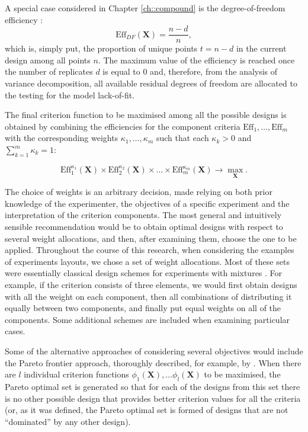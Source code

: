 A special case considered in Chapter \ref{ch::compound} is the degree-of-freedom efficiency \citep{Daniel1976}:
\begin{equation}
\label{eq::DF_eff}
\mbox{Eff}_{DF}(\bm{X})=\frac{n-d}{n},
\end{equation}
which is, simply put, the proportion of unique points $t=n-d$ in the current design among all points $n$. The maximum value of the efficiency is reached once the number of replicates $d$ is equal to $0$ and, therefore, from the analysis of variance decomposition, all available residual degrees of freedom are allocated to the testing for the model lack-of-fit.

The final criterion function to be maximised among all the possible designs is obtained by combining the efficiencies for the component criteria $\mbox{Eff}_{1},\ldots, \mbox{Eff}_{m}$ with the corresponding weights $\kappa_{1},\ldots ,\kappa_{m}$ such that each $\kappa_{k}>0$ and $\sum_{k=1}^{m}\kappa_{k}=1:$

\begin{equation}
\label{eq::compound}
\mbox{Eff}^{\kappa_{1}}_{1}(\bm{X})\times\mbox{Eff}^{\kappa_{2}}_{2}(\bm{X})\times\ldots\times\mbox{Eff}^{\kappa_{m}}_{m}(\bm{X})\rightarrow \underset{\bm{X}}\max.
\end{equation}

The choice of weights is an arbitrary decision, made relying on both prior knowledge of the experimenter, the objectives of a specific experiment and the interpretation of the criterion components. The most general and intuitively sensible recommendation would be to obtain optimal designs with respect to several weight allocations, and then, after examining them, choose the one to be applied. Throughout the course of this research, when considering the examples of experiments layouts, we chose a set of weight allocations. Most of these sets were essentially classical design schemes for experiments with mixtures \citep{Cornell2011Mixtures}. For example, if the criterion consists of three elements, we would first obtain designs with all the weight on each component, then all combinations of distributing it equally between two components, and finally put equal weights on all of the components. Some additional schemes are included when examining particular cases.  

Some of the alternative approaches of considering several objectives would include the Pareto frontier approach, thoroughly described, for example, by \cite{Lu2011optimization}. When there are $l$ individual criterion functions $\phi_1(\bm{X}),\ldots\phi_{l}(\bm{X})$ to be maximised, the Pareto optimal set is generated so that for each of the designs from this set there is no other possible design that provides better criterion values for all the criteria (or, as it was defined, the Pareto optimal set is formed of designs that are not ``dominated'' by any other design).

